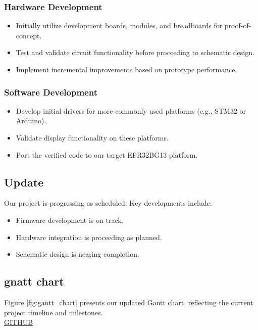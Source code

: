 \documentclass[a4paper,11pt]{article}%
\begin{document}
\subsubsection{Hardware Development}
\begin{itemize}
    \item Initially utilize development boards, modules, and breadboards for proof-of-concept.
    \item Test and validate circuit functionality before proceeding to schematic design.
    \item Implement incremental improvements based on prototype performance.
\end{itemize}

\subsubsection{Software Development}
\begin{itemize}
   
    \item Develop initial drivers for more commonly used platforms (e.g., STM32 or Arduino).
    \item Validate display functionality on these platforms.
    \item Port the verified code to our target EFR32BG13 platform.

\end{itemize}


\subsection{Update}
Our project is progressing as scheduled. Key developments include:
\begin{itemize}
    \item Firmware development is on track.
    \item Hardware integration is proceeding as planned.
    \item Schematic design is nearing completion.
\end{itemize}

\subsection{gnatt chart}
Figure \ref{fig:gantt_chart} presents our updated Gantt chart, reflecting the current project timeline and milestones.\\
{\center
\href{https://github.com/users/parthishere/projects/2/views/1}
{GITHUB}}
\end{document}
